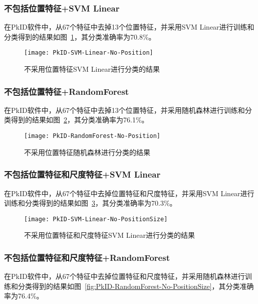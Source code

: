 \subsubsection{不包括位置特征+SVM Linear}
在PkID软件中，从67个特征中去掉13个位置特征，并采用SVM Linear进行训练和分类得到的结果如图~\ref{fig:PkID-SVM-Linear-No-Position}，其分类准确率为70.8\%。

\begin{figure}[!ht]
\centering
\texttt{[image: PkID-SVM-Linear-No-Position]}
\caption{不采用位置特征SVM Linear进行分类的结果}
\label{fig:PkID-SVM-Linear-No-Position}
\end{figure}

\subsubsection{不包括位置特征+RandomForest}
在PkID软件中，从67个特征中去掉13个位置特征，并采用随机森林进行训练和分类得到的结果如图~\ref{fig:PkID-RandomForest-No-Position}，其分类准确率为76.1\%。

\begin{figure}[!ht]
\centering
\texttt{[image: PkID-RandomForest-No-Position]}
\caption{不采用位置特征随机森林进行分类的结果}
\label{fig:PkID-RandomForest-No-Position}
\end{figure}

\subsubsection{不包括位置特征和尺度特征+SVM Linear}
在PkID软件中，从67个特征中去掉位置特征和尺度特征，并采用SVM Linear进行训练和分类得到的结果如图~\ref{fig:PkID-SVM-Linear-No-PositionSize}，其分类准确率为70.3\%。

\begin{figure}[!ht]
\centering
\texttt{[image: PkID-SVM-Linear-No-PositionSize]}
\caption{不采用位置特征和尺度特征SVM Linear进行分类的结果}
\label{fig:PkID-SVM-Linear-No-PositionSize}
\end{figure}

\subsubsection{不包括位置特征和尺度特征+RandomForest}
在PkID软件中，从67个特征中去掉位置特征和尺度特征，并采用随机森林进行训练和分类得到的结果如图~\ref{fig:PkID-RandomForest-No-PositionSize}，其分类准确率为76.4\%。

